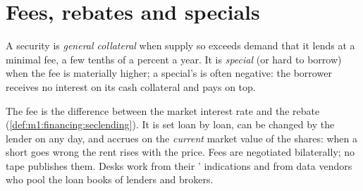 \section{Fees, rebates and specials}

\begin{definition}\label{def:m1:stock-loan-and-short-selling:special}
A security is \emph{general collateral} when supply
so exceeds demand that it lends at a minimal fee, a few tenths of a percent a
year. It is \emph{special} (or hard to borrow) when the fee is
materially higher; a special's  is often negative: the borrower
receives no interest on its cash collateral and pays on top.
\end{definition}

The fee is the difference between the market interest rate and the rebate
(\cref{def:m1:financing:seclending}). It is set loan by loan, can be changed
by the lender on any day, and accrues on the \emph{current} market value of
the shares: when a short goes wrong the rent rises with the price. Fees are
negotiated bilaterally; no tape publishes them. Desks work from their ' indications and from data vendors who pool the loan books of
lenders and brokers.

\begin{omfigure}

\label{fig:m1:stock-loan-and-short-selling:fee}
\end{omfigure}

